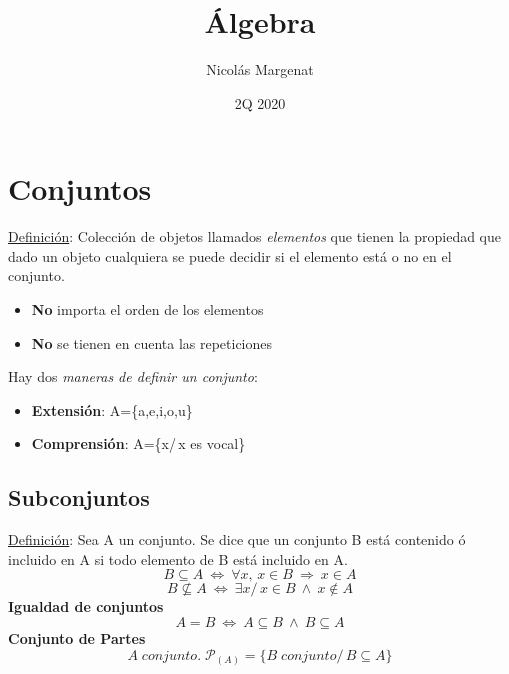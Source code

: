 \documentclass{article}
\title{Álgebra}
\author{Nicolás Margenat}
\date{2Q 2020}
\newcommand{\lands}{\:\land\:}                          %
\newcommand{\comma}{,\,}                                %
\newcommand{\tq}{/\,}                                   %
\newcommand{\Rightarrows}{\: \Rightarrow \:}            %
\newcommand{\Leftrightarrows}{\: \Leftrightarrow \:}    %
\begin{document}
\maketitle
\tableofcontents

\pagebreak
\section{Conjuntos}
\underline{Definición}: Colección de objetos llamados \emph{elementos} que tienen la propiedad que dado
un objeto cualquiera se puede decidir si el elemento está o no en el conjunto.
\begin{itemize}
    \item \textbf{No} importa el orden de los elementos
    \item \textbf{No} se tienen en cuenta las repeticiones
\end{itemize}
Hay dos \emph{maneras de definir un conjunto}:
\begin{itemize}
    \item \textbf{Extensión}:  A=\{a,e,i,o,u\}
    \item \textbf{Comprensión}: A=\{x\tq x es vocal\}
\end{itemize}

\subsection{Subconjuntos}
\underline{Definición}: Sea A un conjunto. Se dice que un conjunto B está contenido ó incluido en A
si todo elemento de B está incluido en A.
\begin{equation*}
    B \subseteq A \Leftrightarrows \forall x\comma x \in B \Rightarrows x \in A
\end{equation*}
\begin{equation*}
    B \nsubseteq A \Leftrightarrows \exists x \tq x \in B \lands  x \notin A
\end{equation*}
\textbf{Igualdad de conjuntos}
\begin{equation*}
    A = B \Leftrightarrows A \subseteq B \lands B \subseteq A
\end{equation*}
\textbf{Conjunto de Partes}
\begin{equation*}
    A \; conjunto. \;\mathcal{P}_{(A)}=\{B \; conjunto \tq B \subseteq A \}
\end{equation*}
\end{document}
